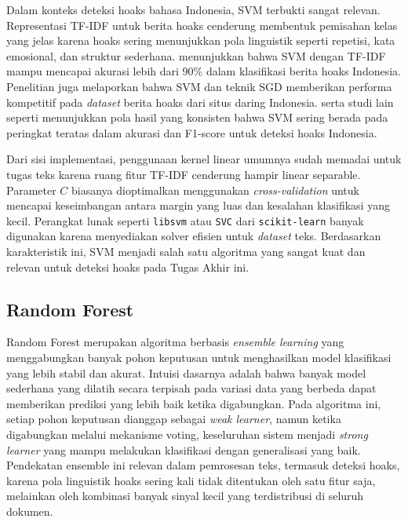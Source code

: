 Dalam konteks deteksi hoaks bahasa Indonesia, SVM terbukti sangat relevan. Representasi TF-IDF untuk berita hoaks cenderung membentuk pemisahan kelas yang jelas karena hoaks sering menunjukkan pola linguistik seperti repetisi, kata emosional, dan struktur sederhana. \textcite{sihombing2020article} menunjukkan bahwa SVM dengan TF-IDF mampu mencapai akurasi lebih dari 90\% dalam klasifikasi berita hoaks Indonesia. Penelitian \textcite{prasetijo2017hoax} juga melaporkan bahwa SVM dan teknik SGD memberikan performa kompetitif pada \textit{dataset} berita hoaks dari situs daring Indonesia. \textcite{triyono2023indonesian} serta studi lain seperti \textcite{safira2023comparative} menunjukkan pola hasil yang konsisten bahwa SVM sering berada pada peringkat teratas dalam akurasi dan F1-score untuk deteksi hoaks Indonesia.

Dari sisi implementasi, penggunaan kernel linear umumnya sudah memadai untuk tugas teks karena ruang fitur TF-IDF cenderung hampir linear separable. Parameter $C$ biasanya dioptimalkan menggunakan \textit{cross-validation} untuk mencapai keseimbangan antara margin yang luas dan kesalahan klasifikasi yang kecil. Perangkat lunak seperti \texttt{libsvm} atau \texttt{SVC} dari \texttt{scikit-learn} banyak digunakan karena menyediakan solver efisien untuk \textit{dataset} teks. Berdasarkan karakteristik ini, SVM menjadi salah satu algoritma yang sangat kuat dan relevan untuk deteksi hoaks pada Tugas Akhir ini.


\subsection{Random Forest}

Random Forest merupakan algoritma berbasis \textit{ensemble learning} yang menggabungkan banyak pohon keputusan untuk menghasilkan model klasifikasi yang lebih stabil dan akurat. Intuisi dasarnya adalah bahwa banyak model sederhana yang dilatih secara terpisah pada variasi data yang berbeda dapat memberikan prediksi yang lebih baik ketika digabungkan. Pada algoritma ini, setiap pohon keputusan dianggap sebagai \textit{weak learner}, namun ketika digabungkan melalui mekanisme voting, keseluruhan sistem menjadi \textit{strong learner} yang mampu melakukan klasifikasi dengan generalisasi yang baik. Pendekatan ensemble ini relevan dalam pemrosesan teks, termasuk deteksi hoaks, karena pola linguistik hoaks sering kali tidak ditentukan oleh satu fitur saja, melainkan oleh kombinasi banyak sinyal kecil yang terdistribusi di seluruh dokumen.

